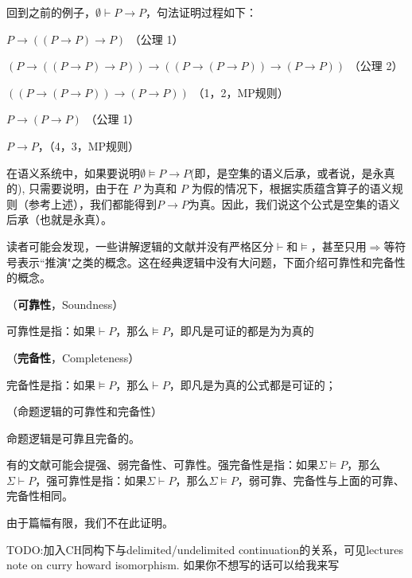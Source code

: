 回到之前的例子，$\emptyset \vdash P \to P$，句法证明过程如下：
\begin{tightenum}
 \item $ P \to ((P \to P) \to P)$ （公理 1）
 \item $(P \to ((P \to P) \to P)) \to ((P \to (P \to P)) \to (P \to P))$ （公理 2）
 \item $((P \to (P \to P)) \to (P \to P))$ （1，2，MP规则）
 \item  $P \to (P \to P)$ （公理 1）
 \item  $P \to P$，（4，3，MP规则）
\end{tightenum}

在语义系统中，如果要说明$\emptyset \models P \to P$(即，是空集的语义后承，或者说，是永真的),
只需要说明，由于在 $P$ 为真和 $P$ 为假的情况下，根据实质蕴含算子的语义规则（参考上述），我们都能得到$P \to P$为真。因此，我们说这个公式是空集的语义后承（也就是永真）。


读者可能会发现，一些讲解逻辑的文献并没有严格区分$\vdash$和$\models$，甚至只用$\Rightarrow$等符号表示``推演"之类的概念。这在经典逻辑中没有大问题，下面介绍可靠性和完备性的概念。


\begin{defn}（\textbf{可靠性}，Soundness）

可靠性是指：如果$\vdash P$，那么$\models P$，即凡是可证的都是为为真的

\end{defn}



\begin{defn}（\textbf{完备性}，Completeness）

完备性是指：如果$\models P$，那么$\vdash P$，即凡是为真的公式都是可证的；

\end{defn}


\begin{thm}（命题逻辑的可靠性和完备性）

命题逻辑是可靠且完备的。
\end{thm}

\begin{rem}

有的文献可能会提强、弱完备性、可靠性。强完备性是指：如果$\Sigma \models P$，那么$\Sigma \vdash P$，强可靠性是指：如果$\Sigma \vdash P$，那么$\Sigma \models P$，弱可靠、完备性与上面的可靠、完备性相同。
\end{rem}


由于篇幅有限，我们不在此证明。


TODO:加入CH同构下与delimited/undelimited continuation的关系，可见lectures note on curry howard isomorphism. 如果你不想写的话可以给我来写
